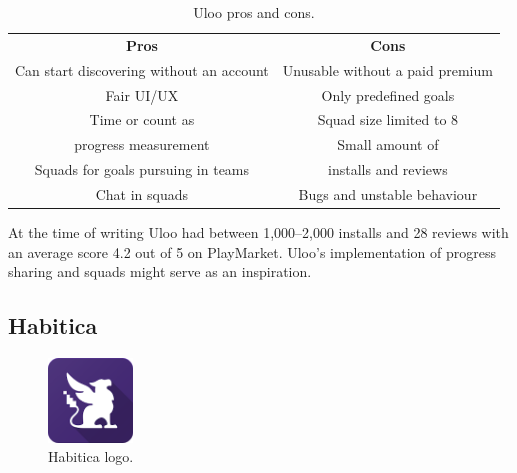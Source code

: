 \begin{table}[h!]
    \centering
    \begin{adjustbox}{width=\textwidth}
        \begin{ctucolortab}
            \begin{tabular}{cc}
                \bfseries Pros & \bfseries Cons\\\Midrule
                Can start discovering without an account & Unusable without a paid premium\\
                Fair UI/UX & Only predefined goals\\
                Time or count as & Squad size limited to 8\\
                progress measurement & Small amount of \\
                Squads for goals pursuing in teams & installs and reviews\\
                Chat in squads & Bugs and unstable behaviour\\
            \end{tabular}
        \end{ctucolortab}
    \end{adjustbox}
    \caption{Uloo pros and cons.}\label{tab:uloo-pros-cons}
\end{table}

At the time of writing Uloo had between 1,000--2,000 installs and 28 reviews with an average score 4.2 out of 5 on PlayMarket.
Uloo's implementation of progress sharing and squads might serve as an inspiration.


\subsection{Habitica}\label{subsec:habitica}

\begin{figure}[h!]
    \includegraphics[width=0.20\textwidth]{images/habitica-logo.png}
    \caption{Habitica logo.\cite{habitica-logo}}
    \label{fig:habitica-logo}
\end{figure}

